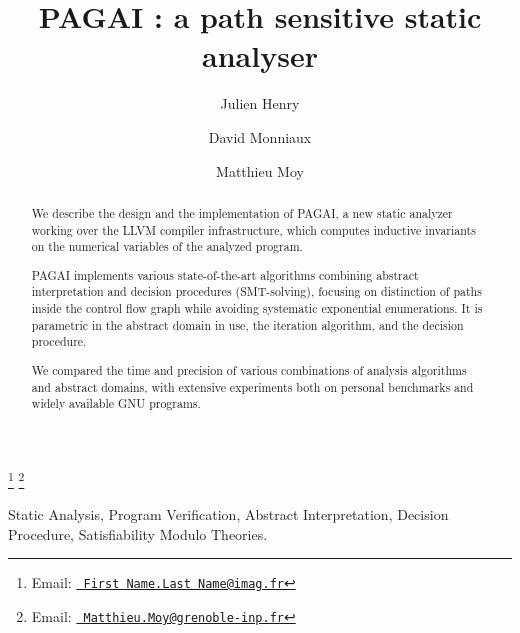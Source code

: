 \documentclass{entcs}
\begin{document}
\begin{frontmatter}
  \title{PAGAI : a path sensitive static analyser} 
  \author{Julien Henry }
  \address{Universit\'e Joseph Fourier, VERIMAG\\
    Grenoble, France} 

  \begin{minipage}{0.45\textwidth}\begin{center}
  \author{David Monniaux}
  \address{CNRS, VERIMAG\\
    Grenoble, France}
  \end{center}\end{minipage}
  \begin{minipage}{0.45\textwidth}\begin{center}
  \author{Matthieu Moy}
  \address{Grenoble-INP, VERIMAG\\
    Grenoble, France} 
  \end{center}\end{minipage}
	
    \thanks[imag.fr]{Email:
    \href{FirstName.LastName@imag.fr} {\texttt{\normalshape
        First Name.Last Name@imag.fr}}} 
    \thanks[grenoble-inp.fr]{Email:
    \href{Matthieu.Moy@grenoble-inp.fr} {\texttt{\normalshape
        Matthieu.Moy@grenoble-inp.fr}}} 
\begin{abstract} 
	We describe the design and the implementation of PAGAI,
        a new static analyzer working over the LLVM compiler infrastructure,
        which computes inductive invariants on the numerical variables of the
        analyzed program.

	PAGAI implements various state-of-the-art algorithms combining
        abstract interpretation and decision procedures (SMT-solving),
        focusing on distinction of paths inside the control flow graph while
        avoiding systematic exponential enumerations.
        It is parametric in the abstract domain in use, the iteration
        algorithm, and the decision procedure.

	We compared the time and precision of various combinations of
	analysis algorithms and abstract domains, with extensive
        experiments both on personal benchmarks and widely available
        GNU programs.
\end{abstract}
\begin{keyword}
	Static Analysis, Program Verification, Abstract Interpretation, Decision
	Procedure, Satisfiability Modulo Theories.
\end{keyword}
\end{frontmatter}
\end{document}
